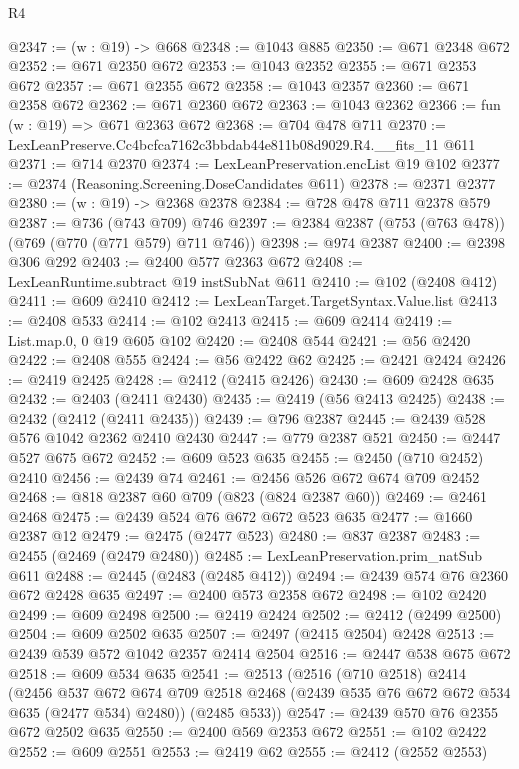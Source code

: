\begin{lexlean}{R4}
\begin{coremodule}
@2347 := (w : @19) -> @668
@2348 := @1043 @885
@2350 := @671 @2348 @672
@2352 := @671 @2350 @672
@2353 := @1043 @2352
@2355 := @671 @2353 @672
@2357 := @671 @2355 @672
@2358 := @1043 @2357
@2360 := @671 @2358 @672
@2362 := @671 @2360 @672
@2363 := @1043 @2362
@2366 := fun (w : @19) => @671 @2363 @672
@2368 := @704 @478 @711
@2370 := LexLeanPreserve.Cc4bcfca7162c3bbdab44e811b08d9029.R4.__fits_11 @611
@2371 := @714 @2370
@2374 := LexLeanPreservation.encList @19 @102
@2377 := @2374 (Reasoning.Screening.DoseCandidates @611)
@2378 := @2371 @2377
@2380 := (w : @19) -> @2368 @2378
@2384 := @728 @478 @711 @2378 @579
@2387 := @736 (@743 @709) @746
@2397 := @2384 @2387 (@753 (@763 @478)) (@769 (@770 (@771 @579) @711 @746))
@2398 := @974 @2387
@2400 := @2398 @306 @292
@2403 := @2400 @577 @2363 @672
@2408 := LexLeanRuntime.subtract @19 instSubNat @611
@2410 := @102 (@2408 @412)
@2411 := @609 @2410
@2412 := LexLeanTarget.TargetSyntax.Value.list
@2413 := @2408 @533
@2414 := @102 @2413
@2415 := @609 @2414
@2419 := List.map.{0, 0} @19 @605 @102
@2420 := @2408 @544
@2421 := @56 @2420
@2422 := @2408 @555
@2424 := @56 @2422 @62
@2425 := @2421 @2424
@2426 := @2419 @2425
@2428 := @2412 (@2415 @2426)
@2430 := @609 @2428 @635
@2432 := @2403 (@2411 @2430)
@2435 := @2419 (@56 @2413 @2425)
@2438 := @2432 (@2412 (@2411 @2435))
@2439 := @796 @2387
@2445 := @2439 @528 @576 @1042 @2362 @2410 @2430
@2447 := @779 @2387 @521
@2450 := @2447 @527 @675 @672
@2452 := @609 @523 @635
@2455 := @2450 (@710 @2452) @2410
@2456 := @2439 @74
@2461 := @2456 @526 @672 @674 @709 @2452
@2468 := @818 @2387 @60 @709 (@823 (@824 @2387 @60))
@2469 := @2461 @2468
@2475 := @2439 @524 @76 @672 @672 @523 @635
@2477 := @1660 @2387 @12
@2479 := @2475 (@2477 @523)
@2480 := @837 @2387
@2483 := @2455 (@2469 (@2479 @2480))
@2485 := LexLeanPreservation.prim_natSub @611
@2488 := @2445 (@2483 (@2485 @412))
@2494 := @2439 @574 @76 @2360 @672 @2428 @635
@2497 := @2400 @573 @2358 @672
@2498 := @102 @2420
@2499 := @609 @2498
@2500 := @2419 @2424
@2502 := @2412 (@2499 @2500)
@2504 := @609 @2502 @635
@2507 := @2497 (@2415 @2504) @2428
@2513 := @2439 @539 @572 @1042 @2357 @2414 @2504
@2516 := @2447 @538 @675 @672
@2518 := @609 @534 @635
@2541 := @2513
    (@2516
      (@710 @2518)
      @2414
      (@2456
        @537
        @672
        @674
        @709
        @2518
        @2468
        (@2439 @535 @76 @672 @672 @534 @635 (@2477 @534) @2480))
      (@2485 @533))
@2547 := @2439 @570 @76 @2355 @672 @2502 @635
@2550 := @2400 @569 @2353 @672
@2551 := @102 @2422
@2552 := @609 @2551
@2553 := @2419 @62
@2555 := @2412 (@2552 @2553)

\end{coremodule}
\end{lexlean}

